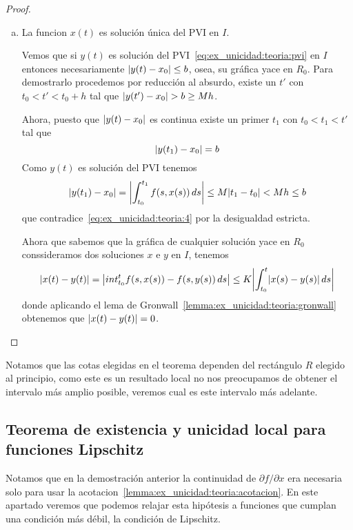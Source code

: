 \documentclass[../ecuaciones_diferenciales.tex]{subfiles}
\begin{document}
\begin{proof}
\begin{enumerate}[(a)]
        \item La funcion \(x(t)\) es solución única del PVI en \(I\).
        
        Vemos que si \(y(t)\) es solución del PVI~\ref{eq:ex_unicidad:teoria:pvi} en \(I\) entonces
        necesariamente \(\abs{y(t) - x_0} \leq b\), osea, su gráfica yace en \(R_0\). Para demostrarlo procedemos
        por reducción al absurdo, existe un \(t'\) con \(t_0 < t' < t_0 + h\) tal que \(\abs{y(t') - x_0} > b \geq Mh\).

        Ahora, puesto que \(\abs{y(t) - x_0}\) es continua existe un primer \(t_1\) con \(t_0 < t_1 < t'\) tal que
        \begin{equation}\label{eq:ex_unicidad:teoria:4}
            \abs{y(t_1) - x_0} = b
        \end{equation}
        Como \(y(t)\) es solución del PVI tenemos
        \[
            \abs{y(t_1) - x_0} = \abs{\int_{t_0}^{t_1} f(s, x(s)) \, ds} \leq M \abs{t_1 - t_0} < Mh \leq b
        \]
        que contradice~\ref{eq:ex_unicidad:teoria:4} por la desigualdad estricta.

        Ahora que sabemos que la gráfica de cualquier solución yace en \(R_0\) conssideramos dos soluciones
        \(x\) e \(y\) en \(I\), tenemos
        \[
            \abs{x(t) - y(t)} = \abs{int_{t_0}^t f(s, x(s)) - f(s, y(s)) \, ds} \leq K \abs{\int_{t_0}^t \abs{x(s) - y(s)} \, ds} 
        \]
        donde aplicando el lema de Gronwall~\ref{lemma:ex_unicidad:teoria:gronwall} obtenemos
        que \(\abs{x(t) - y(t)} = 0\).

    \end{enumerate}
\end{proof}

Notamos que las cotas elegidas en el teorema dependen del rectángulo \(R\) elegido al principio, como este
es un resultado local no nos preocupamos de obtener el intervalo más amplio posible, veremos cual es este intervalo
más adelante.

\subsection{Teorema de existencia y unicidad local para funciones Lipschitz}

Notamos que en la demostración anterior la continuidad de \(\partial f / \partial x\) era necesaria solo para
usar la acotacion~\ref{lemma:ex_unicidad:teoria:acotacion}. En este apartado veremos que podemos relajar esta hipótesis
a funciones que cumplan una condición más débil, la condición de Lipschitz.
\end{document}
